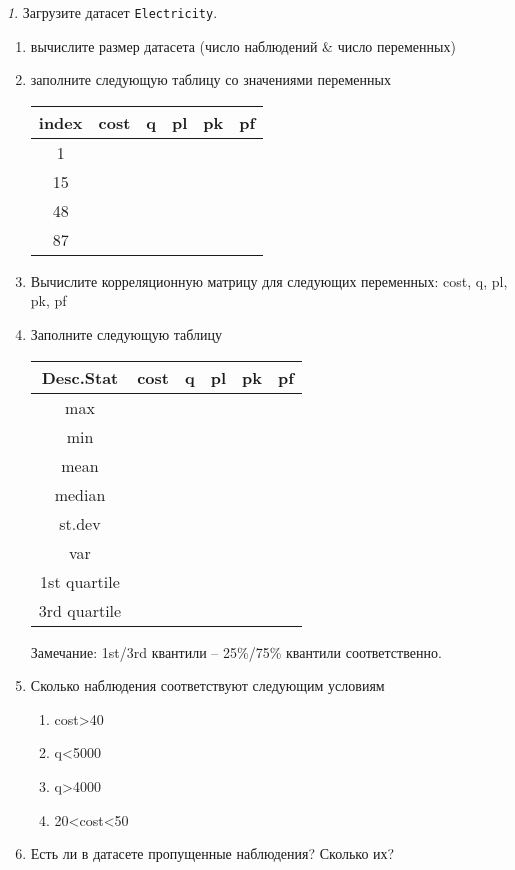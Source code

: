\documentclass[12pt]{article}
\theoremstyle{remark}
\newtheorem{exercise}{}[section]
\begin{document}
\begin{exercise}
Загрузите датасет \texttt{Electricity}.
\begin{enumerate}
	\item вычислите размер датасета (число наблюдений \& число переменных)
	\item заполните следующую таблицу со значениями переменных
	\begin{center}
		\begin{tabular}{|c|c|c|c|c|c|} \hline
			index & cost & q & pl & pk & pf \\ \hline\hline
			1 & & & & & \\ \hline
			15 & & & &  & \\ \hline
			48 & & & & & \\ \hline
			87 & & & & & \\ \hline
		\end{tabular}
	\end{center}
	\item Вычислите корреляционную матрицу для следующих переменных: cost, q, pl, pk, pf 
	\item Заполните следующую таблицу
	\begin{center}
		\begin{tabular}{|c|c|c|c|c|c|} \hline
			Desc.Stat & cost & q & pl & pk & pf\\ \hline\hline
			max & & & & & \\ \hline
			min & & & & & \\ \hline
			mean & & & &  & \\ \hline
			median & & & & & \\ \hline
			st.dev & & & & & \\ \hline
			var & & & & & \\ \hline
			1st quartile & & & & & \\ \hline
			3rd quartile & & & & & \\ \hline
		\end{tabular}
	\end{center}
	Замечание: 1st/3rd квантили -- 25\%/75\% квантили соответственно.
	\item Сколько наблюдения соответствуют следующим условиям
		\begin{enumerate}
			\item cost>40
			\item q<5000
			\item q>4000
			\item 20<cost<50
		\end{enumerate}
	\item Есть ли в датасете пропущенные наблюдения?
	Сколько их?
\end{enumerate}
\end{exercise}
\end{document}
